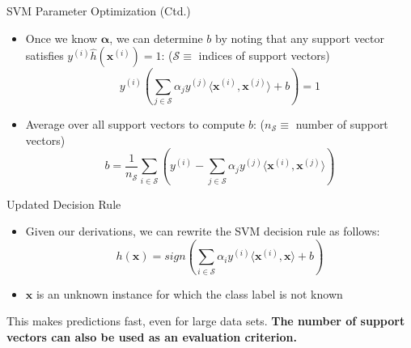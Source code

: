 \begin{frame}{SVM Parameter Optimization (Ctd.)}{}\optional
	\begin{itemize}
		\item Once we know $\bm{\alpha}$, we can determine $b$ by noting that any
			support vector satisfies $y^{(i)} \widehat{h}(\bm{x}^{(i)}) = 1$: {\scriptsize ($\mathcal{S} \equiv$ indices of support vectors)}
		\begin{equation}
			y^{(i)} \left( \sum_{j \in \mathcal{S}} \alpha_j y^{(j)} \langle \bm{x}^{(i)}, \bm{x}^{(j)} \rangle + b \right) = 1
		\end{equation}
		\item Average over all support vectors to compute $b$: {\scriptsize ($n_\mathcal{S} \equiv$ number of support vectors)}
		\begin{equation}
			b = \frac{1}{n_{\mathcal{S}}} \sum_{i \in \mathcal{S}} \left(
				y^{(i)} - \sum_{j \in \mathcal{S}} \alpha_j y^{(j)} \langle \bm{x}^{(i)}, \bm{x}^{(j)} \rangle
			\right)
		\end{equation}
	\end{itemize}
\end{frame}


\begin{frame}{Updated Decision Rule}{}
	\begin{itemize}
		\item Given our derivations, we can rewrite the SVM decision rule as follows:
		\begin{equation}
			h(\bm{x}) = sign\left( \sum_{i \in \mathcal{S}} \alpha_i y^{(i)} \langle \bm{x}^{(i)}, \bm{x} \rangle + b \right)
		\end{equation}
		\item $\bm{x}$ is an unknown instance for which the class label is not known
	\end{itemize}

	\vspace*{2mm}
	\begin{boxBlueNoFrame}
		\footnotesize
		 This makes predictions fast, even for large data sets.
		\textbf{The number of support vectors can also be used as an evaluation criterion.}
	\end{boxBlueNoFrame}
\end{frame}


